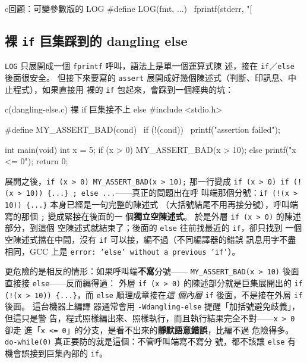 \begin{code}{c}{回顧：可變參數版的 LOG}
#define LOG(fmt, ...) \
    fprintf(stderr, "[%
\end{code}

\subsection{裸 \texttt{if} 巨集踩到的 dangling else}

\texttt{LOG} 只展開成一個 \texttt{fprintf} 呼叫，語法上是單一個運算式陳
述，接在 \texttt{if}／\texttt{else} 後面很安全。 但接下來要寫的
\texttt{assert} 展開成好幾個陳述式（判斷、印訊息、中止程式），如果直接用
裸的 \texttt{if} 包起來，會踩到一個經典的坑：

\begin{example}{c}{(dangling-else.c) 裸 if 巨集接不上 else}
#include <stdio.h>

#define MY_ASSERT_BAD(cond) \
    if (!(cond)) { \
        printf("assertion failed\n"); \
    }

int main(void) {
    int x = 5;
    if (x > 0)
        MY_ASSERT_BAD(x > 10);
    else
        printf("x <= 0\n");
    return 0;
}
\end{example}

展開之後，\texttt{if (x > 0) MY\_ASSERT\_BAD(x > 10);} 那一行變成
\texttt{if (x > 0) if (!(x > 10)) \{...\} ; else ...}——真正的問題出在呼
叫端那個分號：\texttt{if (!(x > 10)) \{...\}} 本身已經是一句完整的陳述式
（大括號結尾不用再接分號），呼叫端寫的那個 \texttt{;} 變成緊接在後面的一
個\textbf{獨立空陳述式}。 於是外層 \texttt{if (x > 0)} 的陳述部分，到這個
空陳述式就結束了；後面的 \texttt{else} 往前找最近的 \texttt{if}，卻只找到
一個空陳述式擋在中間，沒有 \texttt{if} 可以接，編不過（不同編譯器的錯誤
訊息用字不盡相同，GCC 上是 \texttt{error: 'else' without a previous
'if'}）。

更危險的是相反的情形：如果呼叫端\textbf{不寫}分號——
\texttt{MY\_ASSERT\_BAD(x > 10)} 後面直接接 \texttt{else}——反而編得過：
外層 \texttt{if (x > 0)} 的陳述部分就是巨集展開出的
\texttt{if (!(x > 10)) \{...\}}，而 \texttt{else} 順理成章接在\textit{這
個內層} \texttt{if} 後面，不是接在外層 \texttt{if} 後面。 這台機器上編譯
器通常會用 \texttt{-Wdangling-else} 提醒「加括號避免歧義」，但這只是警
告，程式照樣編出來、照樣執行，而且執行結果完全不對——\texttt{x > 0} 卻走
進「\texttt{x <= 0}」的分支，是看不出來的\textbf{靜默語意錯誤}，比編不過
危險得多。 \texttt{do-while(0)} 真正要防的就是這個：不管呼叫端寫不寫分
號，都不該讓 \texttt{else} 有機會誤接到巨集內部的 \texttt{if}。

